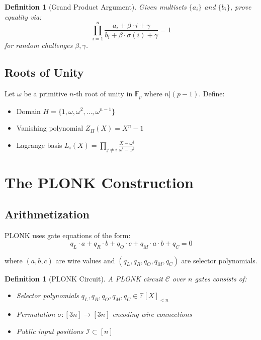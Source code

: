 \documentclass[11pt,a4paper]{article}
\newtheorem{definition}[theorem]{Definition}
\newcommand{\F}{\mathbb{F}}
\begin{document}
\begin{definition}[Grand Product Argument]
Given multisets $\{a_i\}$ and $\{b_i\}$, prove equality via:
\[
\prod_{i=1}^n \frac{a_i + \beta \cdot i + \gamma}{b_i + \beta \cdot \sigma(i) + \gamma} = 1
\]
for random challenges $\beta, \gamma$.
\end{definition}

\subsection{Roots of Unity}

Let $\omega$ be a primitive $n$-th root of unity in $\F_p$ where $n | (p-1)$. Define:
\begin{itemize}
    \item Domain $H = \{1, \omega, \omega^2, \ldots, \omega^{n-1}\}$
    \item Vanishing polynomial $Z_H(X) = X^n - 1$
    \item Lagrange basis $L_i(X) = \prod_{j \neq i} \frac{X - \omega^j}{\omega^i - \omega^j}$
\end{itemize}

\section{The PLONK Construction}
\label{sec:plonk}

\subsection{Arithmetization}

PLONK uses gate equations of the form:
\[
q_L \cdot a + q_R \cdot b + q_O \cdot c + q_M \cdot a \cdot b + q_C = 0
\]

where $(a, b, c)$ are wire values and $(q_L, q_R, q_O, q_M, q_C)$ are selector polynomials.

\begin{definition}[PLONK Circuit]
A PLONK circuit $\mathcal{C}$ over $n$ gates consists of:
\begin{itemize}
    \item Selector polynomials $q_L, q_R, q_O, q_M, q_C \in \F[X]_{<n}$
    \item Permutation $\sigma: [3n] \to [3n]$ encoding wire connections
    \item Public input positions $\mathcal{I} \subset [n]$
\end{itemize}
\end{definition}
\end{document}
